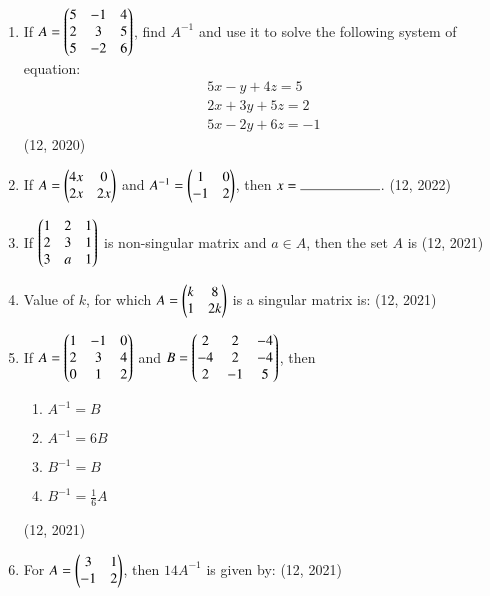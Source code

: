 \begin{enumerate}[label=\thesubsection.\arabic*,ref=\thesubsection.\theenumi]
\item If $A= \begin{pmatrix}5&-1&4\\ 2&3&5\\ 5&-2&6\end{pmatrix}$, find $A^{-1}$ and use it to solve the following system of equation: 
		\begin{align}
			5x-y+4z=5\\
			2x+3y+5z=2\\
			5x-2y+6z=-1
		\end{align}
\hfill (12, 2020)
\item If $A= \begin{pmatrix}4x&0\\2x&2x\end{pmatrix}$ and $A^{-1}=\begin{pmatrix}1&0\\-1&2\end{pmatrix}$, then $x= \rule{2cm}{0.15mm}$.
\hfill (12, 2022)
\item If $\begin{pmatrix}1 & 2 & 1 \\2 & 3 & 1 \\3 & a & 1\end{pmatrix}$
is non-singular matrix and  $a \in A $, then the set $A$ is 
\hfill (12, 2021)
   \item Value of $k$, for which $A =\begin{pmatrix}k & 8 \\ 1 & 2k\end{pmatrix}$ is a singular matrix is:
\hfill (12, 2021)
    \item If $A =\begin{pmatrix}1 &-1 & 0 \\2&3 & 4 \\0&1&2\end{pmatrix}$ and $B = \begin{pmatrix}2&2&-4\\-4&2&-4\\2&-1&5\end{pmatrix}$, then
    \begin{enumerate}
        \item $A^{-1} = B$
        \item $A^{-1} = 6B$
        \item $B^{-1} = B$
        \item $B^{-1} = \frac{1}{6} A$
    \end{enumerate}
\hfill (12, 2021)
    \item For $A =
        \begin{pmatrix}3 & 1 \\ -1 & 2\end{pmatrix}$, then $14A^{-1}$ is given by:
\hfill (12, 2021)
\end{enumerate}
